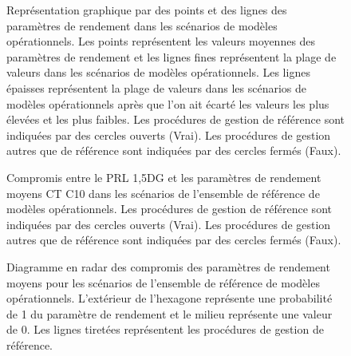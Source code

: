 \documentclass[11pt]{book}
\begin{document}
\begin{figure}[htb]

{\centering {} 

}

\caption{Représentation graphique par des points et des lignes des paramètres de rendement dans les scénarios de modèles opérationnels. Les points représentent les valeurs moyennes des paramètres de rendement et les lignes fines représentent la plage de valeurs dans les scénarios de modèles opérationnels. Les lignes épaisses représentent la plage de valeurs dans les scénarios de modèles opérationnels après que l'on ait écarté les valeurs les plus élevées et les plus faibles. Les procédures de gestion de référence sont indiquées par des cercles ouverts (Vrai). Les procédures de gestion autres que de référence sont indiquées par des cercles fermés (Faux).}\label{fig:dot-lines}
\end{figure}
\clearpage
\begin{figure}[htb]

{\centering {} 

}

\caption{Compromis entre le PRL 1,5DG et les paramètres de rendement moyens CT C10 dans les scénarios de l’ensemble de référence de modèles opérationnels. Les procédures de gestion de référence sont indiquées par des cercles ouverts (Vrai). Les procédures de gestion autres que de référence sont indiquées par des cercles fermés (Faux).}\label{fig:tradeoff-reference}
\end{figure}
\clearpage
\begin{figure}[htb]

{\centering {} 

}

\caption{Diagramme en radar des compromis des paramètres de rendement moyens pour les scénarios de l’ensemble de référence de modèles opérationnels. L’extérieur de l’hexagone représente une probabilité de 1 du paramètre de rendement et le milieu représente une valeur de 0. Les lignes tiretées représentent les procédures de gestion de référence.}\label{fig:spider-satisficed-mps-avg}
\end{figure}
\end{document}
